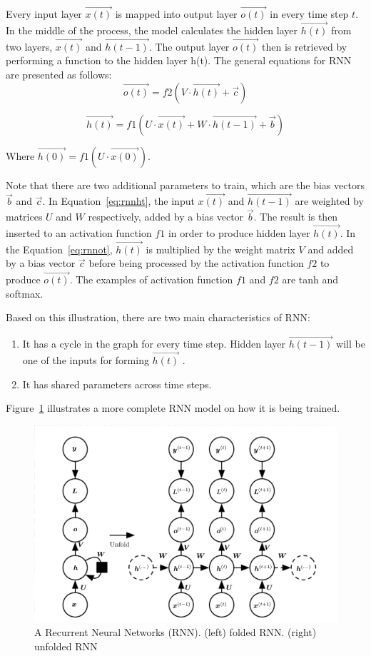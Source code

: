 Every input layer $ \vec{x(t)} $ is mapped into output layer $ \vec{o(t)} $ in every time step $t$. In the middle of the process, the model calculates the hidden layer $ \vec{h(t)} $ from two layers, $ \vec{x(t)} $ and $ \vec{h(t-1)} $. The output layer $ \vec{o(t)} $ then is retrieved by performing a function to the hidden layer h(t). The general equations for RNN are presented as follows:
\begin{equation}
\label{eq:rnnot}
\vec{o(t)} = f2(V \cdot \vec{h(t)} + \vec{c})
\end{equation}

\begin{equation}
\label{eq:rnnht}
\vec{h(t)} = f1(U \cdot \vec{x(t)} + W \cdot \vec{h(t-1)} + \vec{b})
\end{equation}

Where $ \vec{h(0)} = f1(U \cdot \vec{x(0)}) $.

Note that there are two additional parameters to train, which are the bias vectors $\vec{b}$ and $\vec{c}$. In Equation~\ref{eq:rnnht}, the input $\vec{x(t)}$ and $\vec{h(t-1)}$ are weighted by matrices $U$ and $W$ respectively, added by a bias vector $\vec{b}$. The result is then inserted to an activation function $f1$ in order to produce hidden layer $\vec{h(t)}$. In the Equation~\ref{eq:rnnot}, $\vec{h(t)}$ is multiplied by the weight matrix $V$ and added by a bias vector $\vec{c}$ before being processed by the activation function $f2$ to produce $\vec{o(t)}$. The examples of activation function $f1$ and $f2$ are tanh and softmax.

Based on this illustration, there are two main characteristics of RNN:
\begin{enumerate}
	\item It has a cycle in the graph for every time step. Hidden layer $\vec{h(t-1)}$  will be one of the inputs for forming $\vec{h(t)}$ .
	\item It has shared parameters across time steps.
\end{enumerate}

Figure~\ref{fig:fulrnn} illustrates a more complete RNN model on how it is being trained.

\begin{figure}
	\centering
	\includegraphics[width=0.80\linewidth]{images/fullrnn}
	\caption{A Recurrent Neural Networks (RNN). (left) folded RNN. (right) unfolded RNN}
	\label{fig:fulrnn}
\end{figure}

